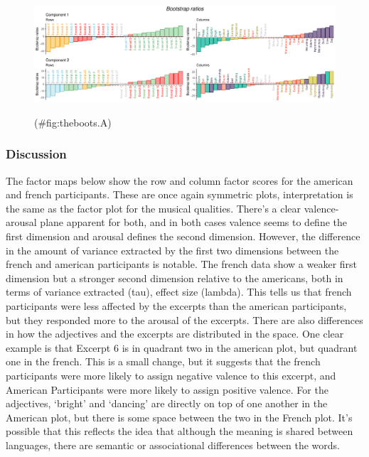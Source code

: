\documentclass[
  english,
  man,floatsintext]{apa6}
\begin{document}
\begin{figure}

{\centering \includegraphics{Music-Descriptor-Space_files/figure-latex/theboots.A-1} 

}

\caption{ }(\#fig:theboots.A)
\end{figure}

\hypertarget{discussion-1}{%
\subsubsection{Discussion}\label{discussion-1}}

The factor maps below show the row and column factor scores for the american and french participants. These are once again symmetric plots, interpretation is the same as the factor plot for the musical qualities. There's a clear valence-arousal plane apparent for both, and in both cases valence seems to define the first dimension and arousal defines the second dimension. However, the difference in the amount of variance extracted by the first two dimensions between the french and american participants is notable. The french data show a weaker first dimension but a stronger second dimension relative to the americans, both in terms of variance extracted (tau), effect size (lambda). This tells us that french participants were less affected by the excerpts than the american participants, but they responded more to the arousal of the excerpts.
There are also differences in how the adjectives and the excerpts are distributed in the space. One clear example is that Excerpt 6 is in quadrant two in the american plot, but quadrant one in the french. This is a small change, but it suggests that the french participants were more likely to assign negative valence to this excerpt, and American Participants were more likely to assign positive valence. For the adjectives, `bright' and `dancing' are directly on top of one another in the American plot, but there is some space between the two in the French plot. It's possible that this reflects the idea that although the meaning is shared between languages, there are semantic or associational differences between the words.
\end{document}
